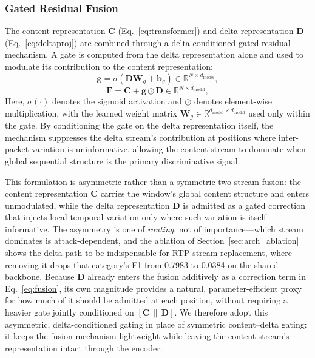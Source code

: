 \subsubsection{Gated Residual Fusion}
\label{sec:fusion}
The content representation $\mathbf{C}$ (Eq.~\eqref{eq:transformer}) and delta representation $\mathbf{D}$ (Eq.~\eqref{eq:deltaproj}) are combined through a delta-conditioned gated residual mechanism. A gate is computed from the delta representation alone and used to modulate its contribution to the content representation:
\begin{equation}
    \mathbf{g} = \sigma\!\left(\mathbf{D}\mathbf{W}_g + \mathbf{b}_g\right) \in \mathbb{R}^{N \times d_{\text{model}}},
    \label{eq:gate}
\end{equation}
\begin{equation}
    \mathbf{F} = \mathbf{C} + \mathbf{g} \odot \mathbf{D} \in \mathbb{R}^{N \times d_{\text{model}}},
    \label{eq:fusion}
\end{equation}
Here, $\sigma(\cdot)$ denotes the sigmoid activation and $\odot$ denotes element-wise multiplication, with the learned weight matrix $\mathbf{W}_g \in \mathbb{R}^{d_{\text{model}} \times d_{\text{model}}}$ used only within the gate. By conditioning the gate on the delta representation itself, the mechanism suppresses the delta stream's contribution at positions where inter-packet variation is uninformative, allowing the content stream to dominate when global sequential structure is the primary discriminative signal.

This formulation is asymmetric rather than a symmetric two-stream fusion: the content representation $\mathbf{C}$ carries the window's global content structure and enters unmodulated, while the delta representation $\mathbf{D}$ is admitted as a gated correction that injects local temporal variation only where such variation is itself informative. The asymmetry is one of \emph{routing}, not of importance---which stream dominates is attack-dependent, and the ablation of Section~\ref{sec:arch_ablation} shows the delta path to be indispensable for RTP stream replacement, where removing it drops that category's F1 from 0.7983 to 0.0384 on the shared backbone. Because $\mathbf{D}$ already enters the fusion additively as a correction term in Eq.~\eqref{eq:fusion}, its own magnitude provides a natural, parameter-efficient proxy for how much of it should be admitted at each position, without requiring a heavier gate jointly conditioned on $[\mathbf{C} \,\|\, \mathbf{D}]$. We therefore adopt this asymmetric, delta-conditioned gating in place of symmetric content--delta gating: it keeps the fusion mechanism lightweight while leaving the content stream's representation intact through the encoder.

